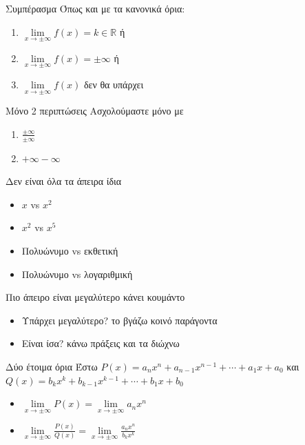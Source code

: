 \documentclass[greek]{beamer}
\begin{document}
\begin{frame}{Συμπέρασμα}
      Όπως και με τα κανονικά όρια:
      \begin{enumerate}
            \item $\lim\limits_{x \to \pm\infty}{ f(x) }=k\in\mathbb{R}$ ή
            \item $\lim\limits_{x \to \pm\infty}{ f(x) }=\pm\infty$ ή
            \item $\lim\limits_{x \to \pm\infty}{ f(x) }$ δεν θα υπάρχει
      \end{enumerate}
\end{frame}

\begin{frame}{Μόνο 2 περιπτώσεις}
      Ασχολούμαστε μόνο με
      \begin{enumerate}
            \item $\frac{\pm\infty}{\pm\infty}$
            \item $+\infty-\infty$
      \end{enumerate}
\end{frame}

\begin{frame}{Δεν είναι όλα τα άπειρα ίδια}
      \begin{itemize}
            \item $x$ vs $x^2$ \pause
            \item $x^2$ vs $x^5$ \pause
            \item Πολυώνυμο vs εκθετική \pause
            \item Πολυώνυμο vs λογαριθμική
      \end{itemize}
\end{frame}

\begin{frame}{Πιο άπειρο είναι μεγαλύτερο κάνει κουμάντο}
      \begin{itemize}
            \item Υπάρχει μεγαλύτερο? το βγάζω κοινό παράγοντα
            \item Είναι ίσα? κάνω πράξεις και τα διώχνω
      \end{itemize}
\end{frame}

\begin{frame}{Δύο έτοιμα όρια}
      Έστω $P(x)=a_nx^n+a_{n-1}x^{n-1}+\cdots +a_1x+a_0$ και $Q(x)=b_kx^k+b_{k-1}x^{k-1}+\cdots +b_1x+b_0$
      \begin{itemize}
            \item $\lim\limits_{x \to \pm\infty}{ P(x) }=\lim\limits_{x \to \pm\infty}{ a_nx^n }$
            \item $\lim\limits_{x \to \pm\infty}{ \frac{P(x)}{Q(x)} }=\lim\limits_{x \to \pm\infty}{ \frac{a_nx^n}{b_kx^k} }$
      \end{itemize}
\end{frame}
\end{document}
